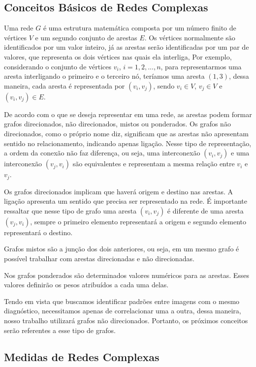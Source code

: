 \documentclass[
12pt,        %
oneside,     %
a4paper,     %
english,       %
brazil        %
%
%
]{ppgca}
\begin{document}
\subsection{Conceitos Básicos de Redes Complexas}
Uma rede $G$ é uma estrutura matemática composta por um número finito de vértices $V$ e um segundo conjunto de arestas $E$. Os vértices normalmente são identificados por um valor inteiro, já as arestas serão identificadas por um par de valores, que representa os dois vértices nas quais ela interliga, Por exemplo, considerando o conjunto de vértices $v_i$, $i = 1, 2, ..., n$, para representarmos uma aresta interligando o primeiro e o terceiro nó, teríamos uma aresta $(1,3)$, dessa maneira, cada aresta é representada por $(v_i, v_j)$, sendo $v_i \in V$, $v_j \in V$ e $(v_i, v_j) \in E$.

De acordo com o que se deseja representar em uma rede, as arestas podem formar grafos direcionados, não direcionados, mistos ou ponderados. Os grafos não direcionados, como o próprio nome diz, significam que as arestas não apresentam sentido no relacionamento, indicando apenas ligação. Nesse tipo de representação, a ordem da conexão não faz diferença, ou seja, uma interconexão $(v_i, v_j)$ e uma interconexão $(v_j, v_i)$ são equivalentes e representam a mesma relação entre $v_i$ e $v_j$.

Os grafos direcionados implicam que haverá origem e destino nas arestas. A ligação apresenta um sentido que precisa ser representado na rede. É importante ressaltar que nesse tipo de grafo uma aresta $(v_i, v_j)$ é diferente de uma aresta $(v_j, v_i)$, sempre o primeiro elemento representará a origem e segundo elemento representará o destino.

Grafos mistos são a junção dos dois anteriores, ou seja, em um mesmo grafo é possível trabalhar com arestas direcionadas e não direcionadas.

Nos grafos ponderados são determinados valores numéricos para as arestas. Esses valores definirão os pesos atribuídos a cada uma delas.

Tendo em vista que buscamos identificar padrões entre imagens com o mesmo diagnóstico, necessitamos apenas de correlacionar uma a outra, dessa maneira, nosso trabalho utilizará grafos não direcionados. Portanto, os próximos conceitos serão referentes a esse tipo de grafos.

\subsection{Medidas de Redes Complexas}
\end{document}
